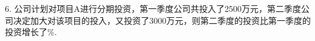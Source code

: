 6.	公司计划对项目A进行分期投资，第一季度公司共投入了2500万元，第二季度公司决定加大对该项目的投入，又投资了3000万元，则第二季度的投资比第一季度的投资增长了\key{\hspace{1cm}}$\%$.



